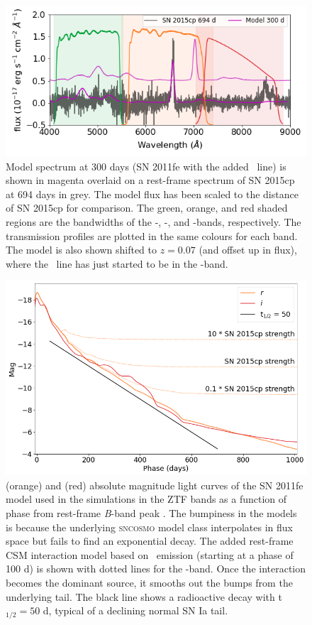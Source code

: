 \documentclass[a4paper,oneside,12pt, class=Latex/Classes/PhDthesisPSnPDF, crop=false]{standalone}
\begin{document}
\begin{figure}
 \centering
 \includegraphics[width=\textwidth]{../Images/chapter_3/Model_15cp_comparison.png}
 \caption{Model spectrum at 300 days (SN 2011fe with the added \Halpha~line) is shown in magenta overlaid on a rest-frame spectrum of SN 2015cp at 694 days in grey. The model flux has been scaled to the distance of SN 2015cp for comparison. The green, orange, and red shaded regions are the bandwidths of the \ztfg-, \ztfr-, and \ztfi-bands, respectively. The transmission profiles are plotted in the same colours for each band. The model is also shown shifted to $z = 0.07$ (and offset up in flux), where the \Halpha~line has just started to be in the \ztfi-band.}
 \label{mod_15cp_comp}
\end{figure}

\begin{figure}
 \centering
 \includegraphics[width=\textwidth]{../Images/chapter_3/11fe_mods.png}
 \caption{\ztfr (orange) and \ztfi (red) absolute magnitude light curves of the SN 2011fe model used in the simulations in the ZTF bands as a function of phase from rest-frame \textit{B}-band peak \citep{spec_HST}. The bumpiness in the models is because the underlying \textsc{sncosmo} model class interpolates in flux space but fails to find an exponential decay. The added rest-frame CSM interaction model based on \Halpha~emission (starting at a phase of 100 d) is shown with dotted lines for the \ztfr-band. Once the interaction becomes the dominant source, it smooths out the bumps from the underlying tail. The black line shows a radioactive decay with t$_{1/2}=50$ d, typical of a declining normal SN Ia tail.}
 \label{11fe_mods}
\end{figure}
\end{document}
